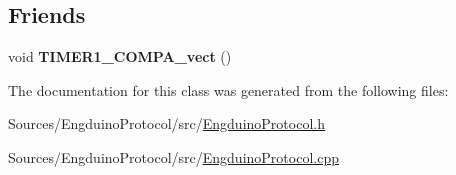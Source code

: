 \subsection*{Friends}
\begin{DoxyCompactItemize}
\item 
\hypertarget{class_engduino_protocol_class_a01641f91ca3e348b0080eeaa767d626b}{}void {\bfseries T\+I\+M\+E\+R1\+\_\+\+C\+O\+M\+P\+A\+\_\+vect} ()\label{class_engduino_protocol_class_a01641f91ca3e348b0080eeaa767d626b}

\end{DoxyCompactItemize}


The documentation for this class was generated from the following files\+:\begin{DoxyCompactItemize}
\item 
Sources/\+Engduino\+Protocol/src/\hyperlink{_engduino_protocol_8h}{Engduino\+Protocol.\+h}\item 
Sources/\+Engduino\+Protocol/src/\hyperlink{_engduino_protocol_8cpp}{Engduino\+Protocol.\+cpp}\end{DoxyCompactItemize}
